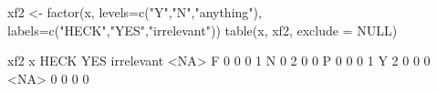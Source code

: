 \begin{Schunk}
\begin{Sinput}
  xf2 <- factor(x, levels=c("Y","N","anything"), labels=c("HECK","YES","irrelevant"))
  table(x, xf2, exclude = NULL)
\end{Sinput}
\begin{Soutput}
      xf2
x      HECK YES irrelevant <NA>
  F       0   0          0    1
  N       0   2          0    0
  P       0   0          0    1
  Y       2   0          0    0
  <NA>    0   0          0    0
\end{Soutput}
\end{Schunk}
